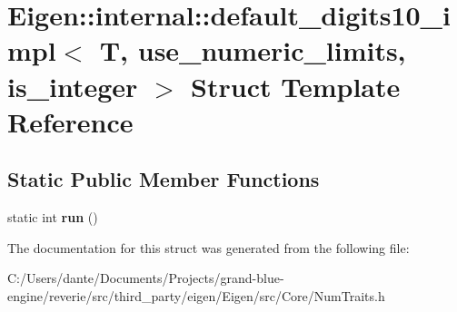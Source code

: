 \hypertarget{struct_eigen_1_1internal_1_1default__digits10__impl}{}\section{Eigen\+::internal\+::default\+\_\+digits10\+\_\+impl$<$ T, use\+\_\+numeric\+\_\+limits, is\+\_\+integer $>$ Struct Template Reference}
\label{struct_eigen_1_1internal_1_1default__digits10__impl}
\subsection*{Static Public Member Functions}
\begin{DoxyCompactItemize}
\item 
\mbox{\label{struct_eigen_1_1internal_1_1default__digits10__impl_a9c5d25b308ff287fca844827847208df}} 
static int {\bfseries run} ()
\end{DoxyCompactItemize}


The documentation for this struct was generated from the following file\+:\begin{DoxyCompactItemize}
\item 
C\+:/\+Users/dante/\+Documents/\+Projects/grand-\/blue-\/engine/reverie/src/third\+\_\+party/eigen/\+Eigen/src/\+Core/Num\+Traits.\+h\end{DoxyCompactItemize}
